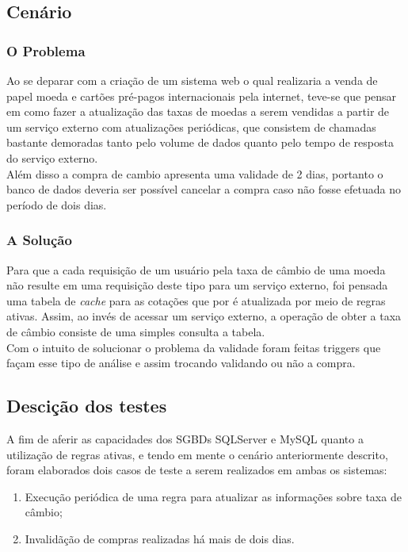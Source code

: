 \documentclass[conference]{IEEEtran}
\begin{document}
  \subsection{Cenário}
    \subsubsection{O Problema} Ao se deparar com a criação de um sistema web o qual realizaria a venda de papel moeda e cartões pré-pagos internacionais pela internet, teve-se que pensar em como fazer a atualização das taxas de moedas a serem vendidas a partir de um serviço externo com atualizações periódicas, que consistem de chamadas bastante demoradas tanto pelo volume de dados quanto pelo tempo de resposta do serviço externo.\\
    Além disso a compra de cambio apresenta uma validade de 2 dias, portanto o banco de dados deveria ser possível cancelar a compra caso não fosse efetuada no período de dois dias.

    \subsubsection{A Solução} Para que a cada requisição de um usuário pela taxa de câmbio de uma moeda não resulte em uma requisição deste tipo para um serviço externo, foi pensada uma tabela de \textit{cache} para as cotações que por é atualizada por meio de regras ativas. Assim, ao invés de acessar um serviço externo, a operação de obter a taxa de câmbio consiste de uma simples consulta a tabela.\\
    Com o intuito de solucionar o problema da validade foram feitas triggers que façam esse tipo de análise e assim trocando validando ou não a compra.

  \subsection{Descição dos testes}
  A fim de aferir as capacidades dos SGBDs SQLServer e MySQL quanto a utilização de regras ativas, e tendo em mente o cenário anteriormente descrito, foram elaborados dois casos de teste a serem realizados em ambas os sistemas:

  \begin{enumerate}
    \item Execução periódica de uma regra para atualizar as informações sobre taxa de câmbio;
    \item Invalidãção de compras realizadas há mais de dois dias.
  \end{enumerate}
\end{document}
